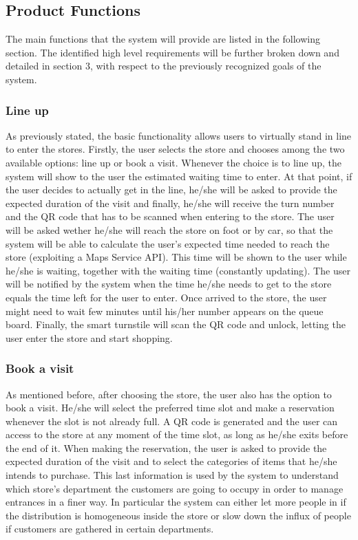 \documentclass{article}
\begin{document}
\subsection{Product Functions}
The main functions that the system will provide are listed in the following section. The identified high level requirements will be further broken down and detailed in section 3, with respect to the previously recognized goals of the system.
\subsubsection{Line up} 
As previously stated, the basic functionality allows users to virtually stand in line to enter the stores. Firstly, the user selects the store and chooses among the two available options: line up or book a visit. Whenever the choice is to line up, the system will show to the user the estimated waiting time to enter. At that point, if the user decides to actually get in the line, he/she will be asked to provide the expected duration of the visit and finally, he/she will receive the turn number and the QR code that has to be scanned when entering to the store. The user will be asked wether he/she will reach the store on foot or by car, so that the system will be able to calculate the user's expected time needed to reach the store (exploiting a Maps Service API). This time will be shown to the user while he/she is waiting, together with the waiting time (constantly updating). The user will be notified by the system when the time he/she needs to get to the store equals the time left for the user to enter. Once arrived to the store, the user might need to wait few minutes until his/her number appears on the queue board. Finally, the smart turnstile will scan the QR code and unlock, letting the user enter the store and start shopping.
\subsubsection{Book a visit} 
As mentioned before, after choosing the store, the user also has the option to book a visit. He/she will select the preferred time slot and make a reservation whenever the slot is not already full. A QR code is generated and the user can access to the store at any moment of the time slot, as long as he/she exits before the end of it. When making the reservation, the user is asked to provide the expected duration of the visit and to select the categories of items that he/she intends to purchase. This last information is used by the system to understand which store’s department the customers are going to occupy in order to manage entrances in a finer way. In particular the system can either let more people in if the distribution is homogeneous inside the store or slow down the influx of people if customers are gathered in certain departments.
\end{document}
